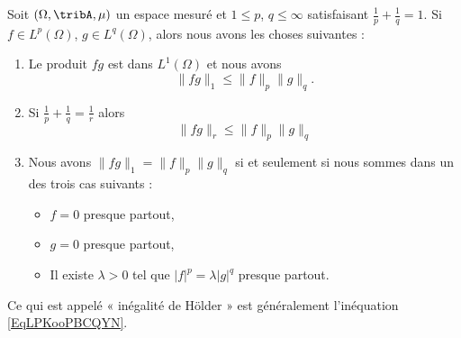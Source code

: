 \begin{proposition}       \label{ProptYqspT}
	Soit \(  (\Omega,\tribA,\mu) \) un espace mesuré et \( 1\leq p\), \( q\leq\infty\) satisfaisant \( \frac{1}{ p }+\frac{1}{ q }=1\). Si \( f\in L^p(\Omega)\), \( g\in L^q(\Omega)\), alors nous avons les choses suivantes :

	\begin{enumerate}
		\item       \label{ITEMooNDKPooRKdmgS}
		      Le produit \( fg\) est dans \( L^1(\Omega)\) et nous avons
		      \begin{equation}    \label{EqLPKooPBCQYN}
			      \| fg \|_1\leq \| f \|_p\| g \|_q.
		      \end{equation}
		\item           \label{ITEMooQHLPooRWWMOP}
		      Si \( \frac{1}{ p }+\frac{1}{ q }=\frac{1}{ r }\) alors
		      \begin{equation}    \label{EqAVZooFNyzmT}
			      \| fg \|_r\leq \| f \|_p\| g \|_q
		      \end{equation}
		\item       \label{ITEMooBOYJooRkiAqJ}
		      Nous avons \( \| fg \|_1=\| f \|_p\| g \|_q\) si et seulement si nous sommes dans un des trois cas suivants :
		      \begin{itemize}
			      \item \( f=0\) presque partout,
			      \item \( g=0\) presque partout,
			      \item Il existe \( \lambda> 0\) tel que \( | f |^p=\lambda| g |^q\) presque partout.
		      \end{itemize}
	\end{enumerate}
\end{proposition}
Ce qui est appelé « inégalité de Hölder » est généralement l'inéquation \eqref{EqLPKooPBCQYN}.


